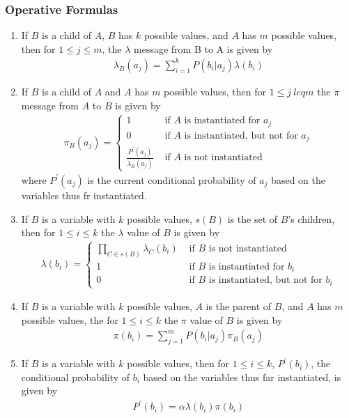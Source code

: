 \documentclass[12pt,twoside]{article}
\begin{document}
	\subsubsection{Operative Formulas}
		\begin{enumerate}
			\item If $B$ is a child of $A$, $B$ has $k$ possible values, and $A$ has $m$ possible values, then for $1\leq j \leq m$, the $\lambda$ message from B to A is given by
				\begin{align*}
					\lambda_B(a_j) = \sum_{i=1}^k P(b_i\vert a_j) \lambda(b_i)
				\end{align*}
	
			\item If $B$ is a child of $A$ and $A$ has $m$ possible values, then for $1 \leq j \ leq m$ the  $\pi$ message from $A$ to $B$ is given by
				\begin{align*}
					\pi_B(a_j) = \begin{cases}
					1															& \text{ if $A$ is instantiated for $a_j$}\\
					0															& \text{ if $A$ is instantiated, but not for $a_j$}\\
					\frac{P^\prime(a_j)}{\lambda_B(a_j)}	& \text{ if $A$ is not instantiated}
					\end{cases}
				\end{align*}
					where $P^\prime (a_j)$ is the current conditional probability of $a_j$ based on the variables thus fr instantiated.
					
			\item If $B$ is a variable with $k$ possible values, $s(B)$ is the set of $B$'s children, then for $1 \leq i \leq k$ the $\lambda$ value of $B$ is given by
				\begin{align*}
					\lambda(b_i) = \begin{cases}
					\prod_{C\in s(B)} \lambda_C(b_i)			&  \text{ if $B$ is not instantiated}\\
					1															&	\text{ if $B$ is instantiated for $b_i$}\\
					0															&	\text{ if $B$ is instantiated, but not for $b_i$}
					\end{cases}
				\end{align*}
				
			\item If $B$ is a variable with $k$ possible values, $A$ is the parent of $B$, and $A$ has $m$ possible values, the for $1\leq i \leq k$ the $\pi$ value of $B$ is given by
				\begin{align*}
					\pi(b_i)	= \sum_{j=1}^m P(b_i\vert a_j) \pi_B(a_j)
				\end{align*}
				
			\item If $B$ is a variable with $k$  possible values, then for $1 \leq i \leq k$, $P^\prime (b_i)$, the conditional probability of $b_i$ based on the variables thus far instantiated, is given by
				\begin{align*}
					P^\prime(b_i) = \alpha \lambda(b_i)\pi(b_i)
				\end{align*}

			\end{enumerate}
\end{document}

